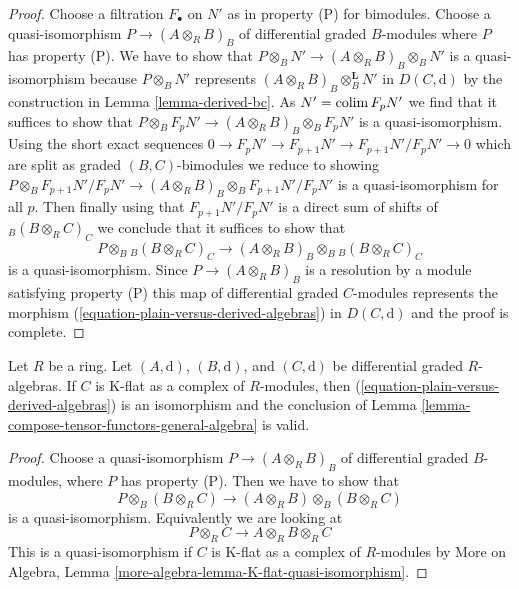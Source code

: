 \begin{proof}
\medskip\noindent
Choose a filtration $F_\bullet$ on $N'$ as in property (P) for bimodules.
Choose a quasi-isomorphism $P \to (A \otimes_R B)_B$
of differential graded $B$-modules where $P$ has property (P).
We have to show that
$P \otimes_B N' \to (A \otimes_R B)_B \otimes_B N'$ is
a quasi-isomorphism because $P \otimes_B N'$ represents
$(A \otimes_R B)_B \otimes_B^\mathbf{L} N'$ in $D(C, \text{d})$
by the construction in Lemma \ref{lemma-derived-bc}.
As $N' = \mathop{\mathrm{colim}}\nolimits F_pN'$ we find
that it suffices to show that
$P \otimes_B F_pN' \to (A \otimes_R B)_B \otimes_B F_pN'$
is a quasi-isomorphism. Using the short exact sequences
$0 \to F_pN' \to F_{p + 1}N' \to F_{p + 1}N'/F_pN' \to 0$
which are split as graded $(B, C)$-bimodules we reduce to showing
$P \otimes_B F_{p + 1}N'/F_pN' \to
(A \otimes_R B)_B \otimes_B F_{p + 1}N'/F_pN'$
is a quasi-isomorphism for all $p$.
Then finally using that $F_{p + 1}N'/F_pN'$
is a direct sum of shifts of ${}_B(B \otimes_R C)_C$
we conclude that it suffices to show that
$$
P \otimes_B {}_B(B \otimes_R C)_C \to
(A \otimes_R B)_B \otimes_B {}_B(B \otimes_R C)_C
$$
is a quasi-isomorphism. Since $P \to (A \otimes_R B)_B$
is a resolution by a module satisfying property (P)
this map of differential graded $C$-modules
represents the morphism (\ref{equation-plain-versus-derived-algebras})
in $D(C, \text{d})$ and the proof is complete.
\end{proof}

\begin{lemma}
\label{lemma-compose-tensor-functors}
Let $R$ be a ring. Let $(A, \text{d})$, $(B, \text{d})$, and
$(C, \text{d})$ be differential graded $R$-algebras.
If $C$ is K-flat as a complex of $R$-modules, then
(\ref{equation-plain-versus-derived-algebras})
is an isomorphism and the conclusion of
Lemma \ref{lemma-compose-tensor-functors-general-algebra} is valid.
\end{lemma}

\begin{proof}
Choose a quasi-isomorphism $P \to (A \otimes_R B)_B$ of differential
graded $B$-modules, where $P$ has property (P). Then we have to show
that
$$
P \otimes_B (B \otimes_R C) \longrightarrow
(A \otimes_R B) \otimes_B (B \otimes_R C)
$$
is a quasi-isomorphism. Equivalently we are looking at
$$
P \otimes_R C \longrightarrow
A \otimes_R B \otimes_R C
$$
This is a quasi-isomorphism if $C$ is K-flat as a complex of $R$-modules by
More on Algebra, Lemma \ref{more-algebra-lemma-K-flat-quasi-isomorphism}.
\end{proof}





